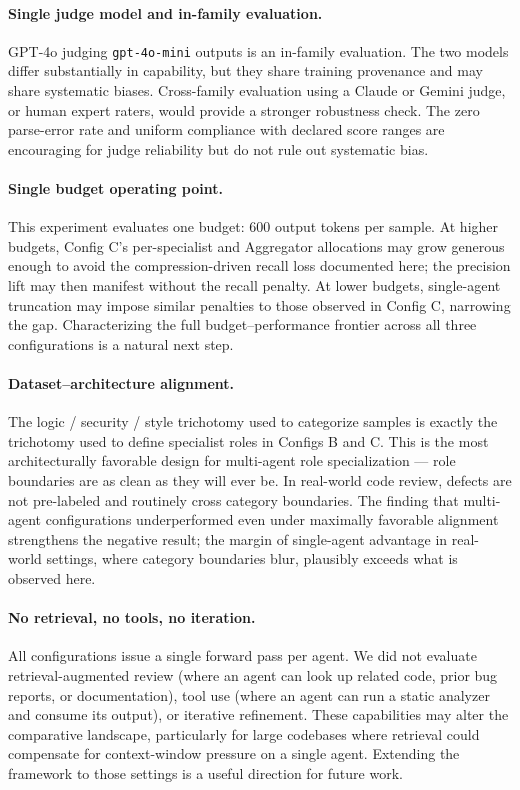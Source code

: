 \documentclass[pdflatex,sn-mathphys-num]{sn-jnl}
\theoremstyle{thmstyleone}
\theoremstyle{thmstyletwo}
\theoremstyle{thmstylethree}
\begin{document}
\paragraph{Single judge model and in-family evaluation.} GPT-4o judging \texttt{gpt-4o-mini} outputs is an in-family evaluation. The two models differ substantially in capability, but they share training provenance and may share systematic biases. Cross-family evaluation using a Claude or Gemini judge, or human expert raters, would provide a stronger robustness check. The zero parse-error rate and uniform compliance with declared score ranges are encouraging for judge reliability but do not rule out systematic bias.

\paragraph{Single budget operating point.} This experiment evaluates one budget: 600 output tokens per sample. At higher budgets, Config C's per-specialist and Aggregator allocations may grow generous enough to avoid the compression-driven recall loss documented here; the precision lift may then manifest without the recall penalty. At lower budgets, single-agent truncation may impose similar penalties to those observed in Config C, narrowing the gap. Characterizing the full budget--performance frontier across all three configurations is a natural next step.

\paragraph{Dataset--architecture alignment.} The logic / security / style trichotomy used to categorize samples is exactly the trichotomy used to define specialist roles in Configs B and C. This is the most architecturally favorable design for multi-agent role specialization --- role boundaries are as clean as they will ever be. In real-world code review, defects are not pre-labeled and routinely cross category boundaries. The finding that multi-agent configurations underperformed even under maximally favorable alignment strengthens the negative result; the margin of single-agent advantage in real-world settings, where category boundaries blur, plausibly exceeds what is observed here.

\paragraph{No retrieval, no tools, no iteration.} All configurations issue a single forward pass per agent. We did not evaluate retrieval-augmented review (where an agent can look up related code, prior bug reports, or documentation), tool use (where an agent can run a static analyzer and consume its output), or iterative refinement. These capabilities may alter the comparative landscape, particularly for large codebases where retrieval could compensate for context-window pressure on a single agent. Extending the framework to those settings is a useful direction for future work.
\end{document}
